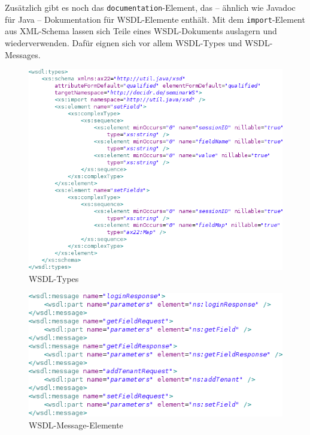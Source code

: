\documentclass[runningheads]{llncs}
\begin{document}
    Zusätzlich gibt es noch das \texttt{documentation}-Element, das -- ähnlich wie Javadoc für Java
    -- Dokumentation für WSDL-Elemente enthält. Mit dem \texttt{import}-Element aus XML-Schema
    lassen sich Teile eines WSDL-Dokuments auslagern und wiederverwenden. Dafür eignen sich vor
    allem WSDL-Types und WSDL-Messages.

    \begin{figure}[tbh]
      \centering
      \includegraphics[width=\textwidth]{../images/wsdl_types.png}
      \caption{WSDL-Types}
      \label{fig:wsdl_types}
    \end{figure}

    \begin{figure}[tbh]
      \centering
      \includegraphics[width=\textwidth]{../images/wsdl_message.png}
      \caption{WSDL-Message-Elemente}
      \label{fig:wsdl_messages}
    \end{figure}
\end{document}
